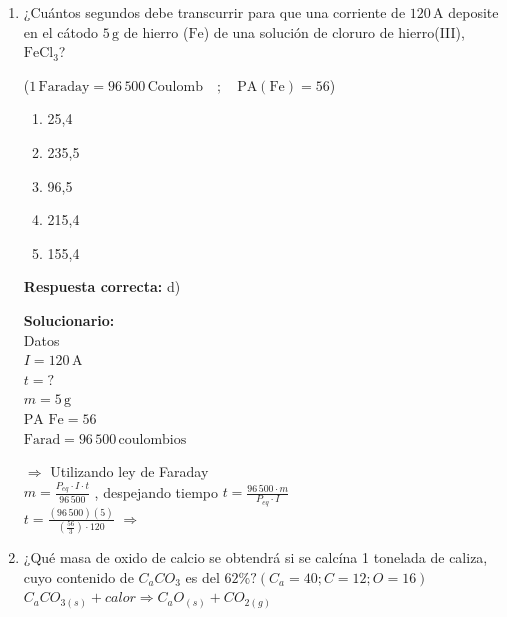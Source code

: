 \begin{enumerate}
	
	Utilizamos la ecuación general de los gases ideales:
	
	$\frac{P_1 V_1}{T_1} = \frac{P_2 V_2}{T_2}$
	
	$\frac{(2400)(a^3)}{T} = \frac{P_2 \cdot \left(\frac{a}{4}\right)^3}{0,4T}$
	
	$\Rightarrow (0,4T)(2400)(a^3) = \frac{P_2 (a^3) T}{64}$
	
	$\Rightarrow$ 
	
	\vspace{6mm}
	
	\item ¿Cuántos segundos debe transcurrir para que una corriente de $120 \, \text{A}$ deposite en el cátodo $5 \, \text{g}$ de hierro ($\text{Fe}$) de una solución de cloruro de hierro(III), $\text{FeCl}_3$?
	
	($1 \, \text{Faraday} = 96\,500 \, \text{Coulomb} \quad ; \quad \text{PA}(\text{Fe}) = 56$)
	\begin{enumerate}[label=\alph*)]
		\item 25,4
		\item 235,5
		\item 96,5
		\item 215,4
		\item 155,4
	\end{enumerate}
	\textbf{Respuesta correcta:} d)
	
	\vspace{2mm}
	\textbf{Solucionario:}\\
	
	Datos\\
	$I = 120 \, \text{A}$\\
	$t = ?$\\
	$m = 5 \, \text{g}$\\
	$\text{PA Fe} = 56$\\
	$\text{Farad} = 96\,500 \, \text{coulombios}$
	
	$\Rightarrow$ Utilizando ley de Faraday\\
	
	$m = \frac{P_{eq} \cdot I \cdot t}{96\,500}$ , despejando tiempo $t = \frac{96\,500 \cdot m}{P_{eq} \cdot I}$\\
	
	$t = \frac{(96\,500)(5)}{\left( \frac{56}{3} \right) \cdot 120}$ $\Rightarrow$ 
	
	
		\item ¿Qué masa de oxido de calcio se obtendrá si se calcína 1 tonelada de caliza, cuyo contenido de $C_aCO_3$ es del $62\%?  (C_a = 40;C=12;O=16)$\\
	$C_aCO_{3(s)}+calor \Rightarrow  C_aO_{(s)}+CO_{2(g)}$
	

\end{enumerate}
